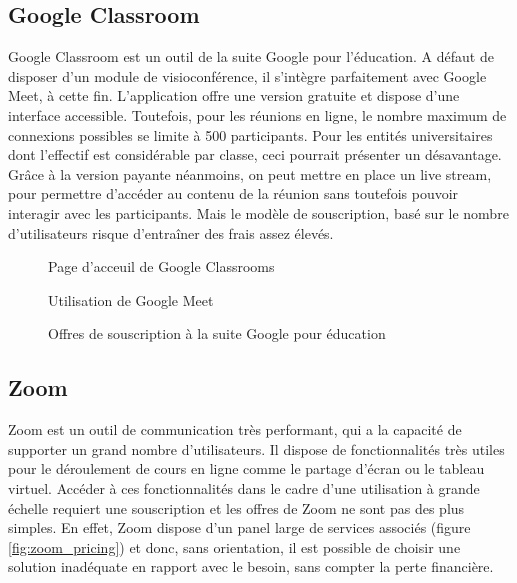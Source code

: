 \subsection{Google Classroom}
Google Classroom est un outil de la suite Google pour l'éducation. 
A défaut de disposer d’un module de visioconférence, il s'intègre parfaitement avec Google Meet, à cette fin. 
L’application offre une version gratuite et dispose d’une interface accessible. 
Toutefois, pour les réunions en ligne, le nombre maximum de connexions possibles se limite à 500 participants. 
Pour les entités universitaires dont l’effectif est considérable par classe, ceci pourrait présenter un désavantage. 
Grâce à la version payante néanmoins, on peut mettre en place un live stream, pour permettre d'accéder au contenu de 
la réunion sans toutefois pouvoir interagir avec les participants. 
Mais le modèle de souscription, basé sur le nombre d’utilisateurs risque d'entraîner des frais assez élevés.

\begin{figure}[H]
  \centering
  \caption{Page d'acceuil de Google Classrooms}
  \label{fig:g_classrooms}
\end{figure}

\break

\begin{figure}[H]
  \centering
  \caption{Utilisation de Google Meet}
  \label{google_meet}
\end{figure}

\begin{figure}[H]
  \centering
  \caption{Offres de souscription à la suite Google pour éducation}
  \label{fig:g_pricing}
\end{figure}

\subsection{Zoom}
Zoom est un outil de communication très performant, qui a la capacité de supporter un grand nombre d’utilisateurs. 
Il dispose de fonctionnalités très utiles pour le déroulement de cours en ligne comme le partage d'écran ou le tableau virtuel. 
Accéder à ces fonctionnalités dans le cadre d’une utilisation à grande échelle requiert une souscription et les offres de Zoom ne sont pas des plus simples. 
En effet, Zoom dispose d’un panel large de services associés (figure \ref{fig:zoom_pricing}) et donc, sans orientation, 
il est possible de choisir une solution inadéquate en rapport avec le besoin, sans compter la perte financière.

